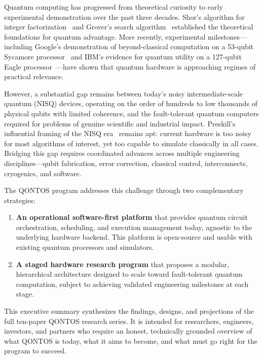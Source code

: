 \documentclass[conference]{IEEEtran}
\begin{document}
Quantum computing has progressed from theoretical curiosity to early experimental demonstration over the past three decades. Shor's algorithm for integer factorization~\cite{shor1994} and Grover's search algorithm~\cite{grover1996} established the theoretical foundations for quantum advantage. More recently, experimental milestones---including Google's demonstration of beyond-classical computation on a 53-qubit Sycamore processor~\cite{arute2019} and IBM's evidence for quantum utility on a 127-qubit Eagle processor~\cite{kim2023}---have shown that quantum hardware is approaching regimes of practical relevance.

However, a substantial gap remains between today's noisy intermediate-scale quantum (NISQ) devices, operating on the order of hundreds to low thousands of physical qubits with limited coherence, and the fault-tolerant quantum computers required for problems of genuine scientific and industrial impact. Preskill's influential framing of the NISQ era~\cite{preskill2018} remains apt: current hardware is too noisy for most algorithms of interest, yet too capable to simulate classically in all cases. Bridging this gap requires coordinated advances across multiple engineering disciplines---qubit fabrication, error correction, classical control, interconnects, cryogenics, and software.

The QONTOS program addresses this challenge through two complementary strategies:

\begin{enumerate}
\item \textbf{An operational software-first platform} that provides quantum circuit orchestration, scheduling, and execution management today, agnostic to the underlying hardware backend. This platform is open-source and usable with existing quantum processors and simulators.

\item \textbf{A staged hardware research program} that proposes a modular, hierarchical architecture designed to scale toward fault-tolerant quantum computation, subject to achieving validated engineering milestones at each stage.
\end{enumerate}

This executive summary synthesizes the findings, designs, and projections of the full ten-paper QONTOS research series. It is intended for researchers, engineers, investors, and partners who require an honest, technically grounded overview of what QONTOS is today, what it aims to become, and what must go right for the program to succeed.
\end{document}
